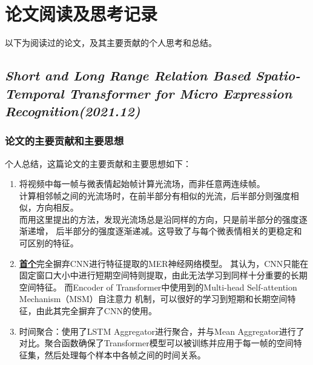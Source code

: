 \documentclass[AutoFakeBold]{MyFormat}
\begin{document}
\chapter{论文阅读及思考记录}
\par 以下为阅读过的论文，及其主要贡献的个人思考和总结。

\section{\textit{Short and Long Range Relation
Based Spatio-Temporal Transformer for
Micro Expression Recognition(2021.12)}\cite{zhang2021short}}

\subsection{论文的主要贡献和主要思想}
\par 个人总结，这篇论文的主要贡献和主要思想如下：
\begin{enumerate}
    \item 将视频中每一帧与微表情起始帧计算光流场，而非任意两连续帧。\\
    计算相邻帧之间的光流场时，在前半部分有相似的光流，后半部分则强度相似，方向相反。\\
    而用这里提出的方法，发现光流场总是沿同样的方向，只是前半部分的强度逐渐递增，
    后半部分的强度逐渐递减。这导致了与每个微表情相关的更稳定和可区别的特征。
    \item \textbf{\Large \underline{首个}}完全摒弃CNN进行特征提取的MER神经网络模型。
    其认为，CNN只能在固定窗口大小中进行短期空间特则提取，由此无法学习到同样十分重要的长期空间特征。
    而Encoder of Transformer中使用到的Multi-head Self-attention Mechanism（MSM）自注意力
    机制，可以很好的学习到短期和长期空间特征，由此其完全摒弃了CNN的使用。
    \item 时间聚合：使用了LSTM Aggregator进行聚合，并与Mean Aggregator进行了对比。聚合函数确保了Transformer模型可以被训练并应用于每一帧的空间特征集，然后处理每个样本中各帧之间的时间关系。
\end{enumerate}
\end{document}
